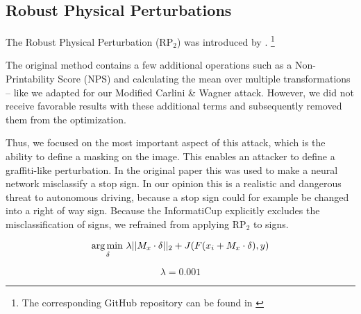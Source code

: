 \subsection{Robust Physical Perturbations}

The Robust Physical Perturbation (RP$_2$) was introduced by \citet{eykholt2018robust}.
\footnote{The corresponding GitHub repository can be found in \cite{rp2repo}}

The original method contains a few additional operations such as a Non-Printability Score (NPS) and calculating the mean over multiple transformations -- like we adapted for our Modified Carlini \& Wagner attack.
However, we did not receive favorable results with these additional terms and subsequently removed them from the optimization.

Thus, we focused on the most important aspect of this attack,
which is the ability to define a masking on the image.
This enables an attacker to define a graffiti-like perturbation.
In the original paper this was used to make a neural network misclassify a stop sign.
In our opinion this is a realistic and dangerous threat to autonomous driving, because a stop sign could for example be changed into a right of way sign.
Because the InformatiCup explicitly excludes the misclassification of signs, we refrained from applying RP$_2$ to signs.

\begin{equation}
\operatorname*{arg\,min\,}_\delta \lambda ||M_x \cdot \delta||_2 + J(F(x_i + M_x \cdot \delta), y)
\end{equation}

\begin{equation}
\lambda=0.001
\end{equation}